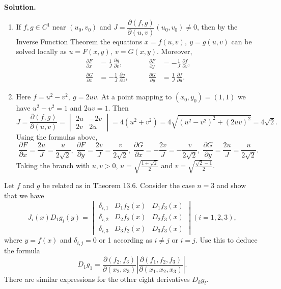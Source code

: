 \noindent\textbf{Solution.}
\begin{enumerate}[label=(\alph*)]
    \item If $f,g\in C^1$ near $(u_0,v_0)$ and $J=\dfrac{\partial(f,g)}{\partial(u,v)}(u_0,v_0)\neq 0$, then by the Inverse Function Theorem the equations $x=f(u,v),\ y=g(u,v)$ can be solved locally as $u=F(x,y),\ v=G(x,y)$. Moreover,
    \[
    \begin{aligned}
    \frac{\partial F}{\partial x}&=\frac{1}{J}\,\frac{\partial g}{\partial v},&\qquad \frac{\partial F}{\partial y}&=-\frac{1}{J}\,\frac{\partial f}{\partial v},\\
    \frac{\partial G}{\partial x}&=-\frac{1}{J}\,\frac{\partial g}{\partial u},&\qquad \frac{\partial G}{\partial y}&=\frac{1}{J}\,\frac{\partial f}{\partial u}.
    \end{aligned}
    \]
    \item Here $f=u^2-v^2,\ g=2uv$. At a point mapping to $(x_0,y_0)=(1,1)$ we have $u^2-v^2=1$ and $2uv=1$. Then
    \[J=\frac{\partial(f,g)}{\partial(u,v)}=\begin{vmatrix}2u&-2v\\2v&2u\end{vmatrix}=4(u^2+v^2)=4\sqrt{(u^2-v^2)^2+(2uv)^2}=4\sqrt{2}.
    \]
    Using the formulas above,
    \[\frac{\partial F}{\partial x}=\frac{2u}{J}=\frac{u}{2\sqrt2},\;\frac{\partial F}{\partial y}=\frac{2v}{J}=\frac{v}{2\sqrt2},\;\frac{\partial G}{\partial x}=-\frac{2v}{J}=-\frac{v}{2\sqrt2},\;\frac{\partial G}{\partial y}=\frac{2u}{J}=\frac{u}{2\sqrt2}.
    \]
    Taking the branch with $u,v>0$, $u=\sqrt{\tfrac{1+\sqrt2}{2}}$ and $v=\sqrt{\tfrac{\sqrt2-1}{2}}$.
\end{enumerate}

\begin{problembox}
Let \( f \) and \( g \) be related as in Theorem 13.6. Consider the case \( n = 3 \) and show that we have
\[J_i(x)D_1g_i(y) =
\begin{vmatrix}
\delta_{i,1} & D_1f_2(x) & D_1f_3(x)\\
\delta_{i,2} & D_2f_2(x) & D_2f_3(x)\\
\delta_{i,3} & D_3f_2(x) & D_3f_3(x)
\end{vmatrix}
(i = 1, 2, 3),\]
where \( y = f(x) \) and \( \delta_{i,j} = 0 \) or 1 according as \( i \neq j \) or \( i = j \). Use this to deduce the formula
\[D_1g_1 = \frac{\partial (f_2, f_3)}{\partial (x_2, x_3)} \left| \frac{\partial (f_1, f_2, f_3)}{\partial (x_1, x_2, x_3)} \right|.\]
There are similar expressions for the other eight derivatives \( D_kg_l \).
\end{problembox}

